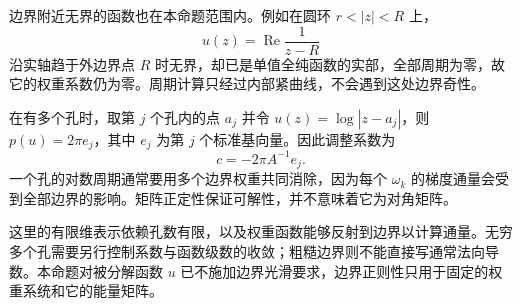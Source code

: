 \ProseParagraphBreak
边界附近无界的函数也在本命题范围内。例如在圆环 \(r<|z|<R\) 上，
\[
 u(z)=\operatorname{Re}\frac1{z-R}
\]
沿实轴趋于外边界点 \(R\) 时无界，却已是单值全纯函数的实部，全部周期为零，故它的权重系数仍为零。周期计算只经过内部紧曲线，不会遇到这处边界奇性。

\ProseParagraphBreak
在有多个孔时，取第 \(j\) 个孔内的点 \(a_j\) 并令
\(u(z)=\log|z-a_j|\)，则 \(p(u)=2\pi e_j\)，其中 \(e_j\) 为第 \(j\) 个标准基向量。因此调整系数为
\[
 c=-2\pi A^{-1}e_j.
\]
一个孔的对数周期通常要用多个边界权重共同消除，因为每个 \(\omega_k\) 的梯度通量会受到全部边界的影响。矩阵正定性保证可解性，并不意味着它为对角矩阵。

\ProseParagraphBreak
这里的有限维表示依赖孔数有限，以及权重函数能够反射到边界以计算通量。无穷多个孔需要另行控制系数与函数级数的收敛；粗糙边界则不能直接写通常法向导数。本命题对被分解函数 \(u\) 已不施加边界光滑要求，边界正则性只用于固定的权重系统和它的能量矩阵。
